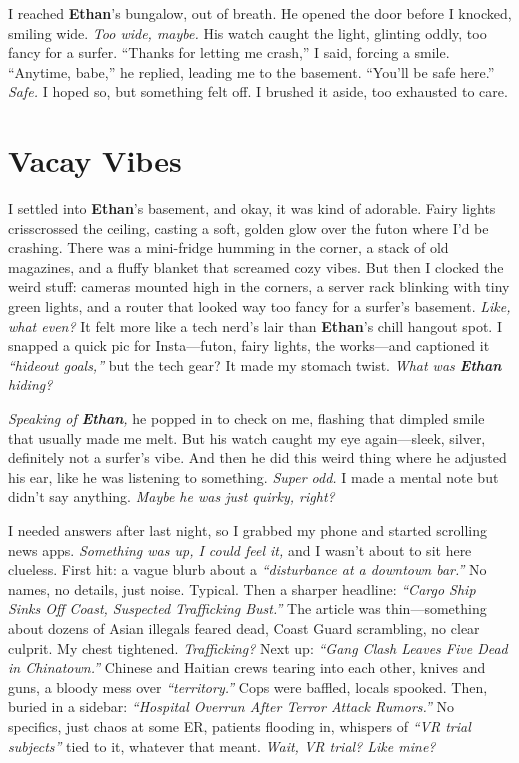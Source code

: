\documentclass{article}
\begin{document}
I reached \textbf{Ethan}’s bungalow, out of breath. He opened the door before I knocked, smiling wide. \textit{Too wide, maybe.} His watch caught the light, glinting oddly, too fancy for a surfer. “Thanks for letting me crash,” I said, forcing a smile. “Anytime, babe,” he replied, leading me to the basement. “You’ll be safe here.” \textit{Safe.} I hoped so, but something felt off. I brushed it aside, too exhausted to care.

\section*{Vacay Vibes}

I settled into \textbf{Ethan}’s basement, and okay, it was kind of adorable. Fairy lights crisscrossed the ceiling, casting a soft, golden glow over the futon where I’d be crashing. There was a mini-fridge humming in the corner, a stack of old magazines, and a fluffy blanket that screamed cozy vibes. But then I clocked the weird stuff: cameras mounted high in the corners, a server rack blinking with tiny green lights, and a router that looked way too fancy for a surfer’s basement. \textit{Like, what even?} It felt more like a tech nerd’s lair than \textbf{Ethan}’s chill hangout spot. I snapped a quick pic for Insta—futon, fairy lights, the works—and captioned it \textit{“hideout goals,”} but the tech gear? It made my stomach twist. \textit{What was \textbf{Ethan} hiding?}

\textit{Speaking of \textbf{Ethan},} he popped in to check on me, flashing that dimpled smile that usually made me melt. But his watch caught my eye again—sleek, silver, definitely not a surfer’s vibe. And then he did this weird thing where he adjusted his ear, like he was listening to something. \textit{Super odd.} I made a mental note but didn’t say anything. \textit{Maybe he was just quirky, right?}

I needed answers after last night, so I grabbed my phone and started scrolling news apps. \textit{Something was up, I could feel it,} and I wasn’t about to sit here clueless. First hit: a vague blurb about a \textit{“disturbance at a downtown bar.”} No names, no details, just noise. Typical. Then a sharper headline: \textit{“Cargo Ship Sinks Off Coast, Suspected Trafficking Bust.”} The article was thin—something about dozens of Asian illegals feared dead, Coast Guard scrambling, no clear culprit. My chest tightened. \textit{Trafficking?} Next up: \textit{“Gang Clash Leaves Five Dead in Chinatown.”} Chinese and Haitian crews tearing into each other, knives and guns, a bloody mess over \textit{“territory.”} Cops were baffled, locals spooked. Then, buried in a sidebar: \textit{“Hospital Overrun After Terror Attack Rumors.”} No specifics, just chaos at some ER, patients flooding in, whispers of \textit{“VR trial subjects”} tied to it, whatever that meant. \textit{Wait, VR trial? Like mine?}
\end{document}
